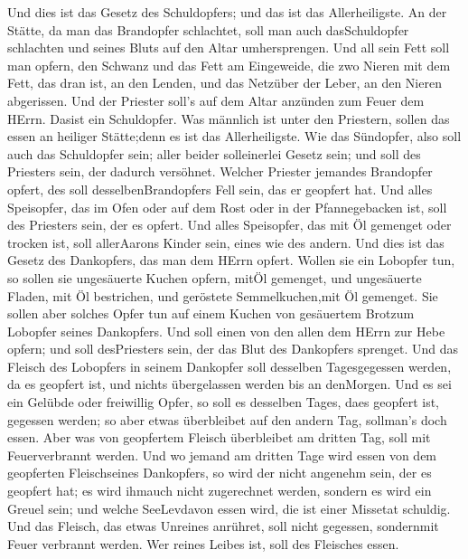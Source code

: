  Und dies ist das Gesetz des Schuldopfers; und das ist das
Allerheiligste.  An der Stätte, da man das Brandopfer
schlachtet, soll man auch dasSchuldopfer schlachten und seines Bluts auf
den Altar umhersprengen.  Und all sein Fett soll man opfern,
den Schwanz und das Fett am Eingeweide,  die zwo Nieren mit
dem Fett, das dran ist, an den Lenden, und das Netzüber der Leber, an
den Nieren abgerissen.  Und der Priester soll's auf dem
Altar anzünden zum Feuer dem HErrn. Dasist ein Schuldopfer. 
Was männlich ist unter den Priestern, sollen das essen an heiliger
Stätte;denn es ist das Allerheiligste.  Wie das Sündopfer,
also soll auch das Schuldopfer sein; aller beider solleinerlei Gesetz
sein; und soll des Priesters sein, der dadurch versöhnet. 
Welcher Priester jemandes Brandopfer opfert, des soll
desselbenBrandopfers Fell sein, das er geopfert hat.  Und
alles Speisopfer, das im Ofen oder auf dem Rost oder in der
Pfannegebacken ist, soll des Priesters sein, der es opfert.
 Und alles Speisopfer, das mit Öl gemenget oder trocken
ist, soll allerAarons Kinder sein, eines wie des andern. 
Und dies ist das Gesetz des Dankopfers, das man dem HErrn opfert.
 Wollen sie ein Lobopfer tun, so sollen sie ungesäuerte
Kuchen opfern, mitÖl gemenget, und ungesäuerte Fladen, mit Öl
bestrichen, und geröstete Semmelkuchen,mit Öl gemenget. 
Sie sollen aber solches Opfer tun auf einem Kuchen von gesäuertem
Brotzum Lobopfer seines Dankopfers.  Und soll einen von den
allen dem HErrn zur Hebe opfern; und soll desPriesters sein, der das
Blut des Dankopfers sprenget.  Und das Fleisch des
Lobopfers in seinem Dankopfer soll desselben Tagesgegessen werden, da es
geopfert ist, und nichts übergelassen werden bis an denMorgen.
 Und es sei ein Gelübde oder freiwillig Opfer, so soll es
desselben Tages, daes geopfert ist, gegessen werden; so aber etwas
überbleibet auf den andern Tag, sollman's doch essen.  Aber
was von geopfertem Fleisch überbleibet am dritten Tag, soll mit
Feuerverbrannt werden.  Und wo jemand am dritten Tage wird
essen von dem geopferten Fleischseines Dankopfers, so wird der nicht
angenehm sein, der es geopfert hat; es wird ihmauch nicht zugerechnet
werden, sondern es wird ein Greuel sein; und welche SeeLevdavon essen
wird, die ist einer Missetat schuldig.  Und das Fleisch,
das etwas Unreines anrühret, soll nicht gegessen, sondernmit Feuer
verbrannt werden. Wer reines Leibes ist, soll des Fleisches essen.
